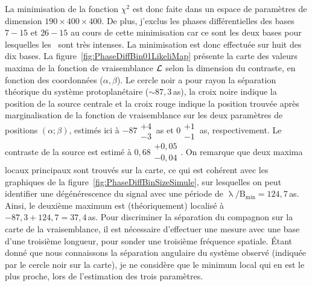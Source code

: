 La minimisation de la fonction $\chi^2$ est donc faite dans un espace de paramètres de dimension $190 \times 400 \times 400$. De plus, j'exclus les phases différentielles des bases $7-15$ et $26-15$ au cours de cette minimisation car ce sont les deux bases pour lesquelles les \wiggles~sont très intenses. La minimisation est donc effectuée sur huit des dix bases. La figure~\ref{fig:PhaseDiffBin01LikeliMap} présente la carte des valeurs maxima de la fonction de vraisemblance $\mathcal{L}$ selon la dimension du contraste, en fonction des coordonnées ($\alpha, \beta$). Le cercle noir a pour rayon la séparation théorique du système protoplanétaire ($\sim 87,3\,$as), la croix noire indique la position de la source centrale et la croix rouge indique la position trouvée après marginalisation de la fonction de vraisemblance sur les deux paramètres de positions $(\alpha; \beta)$, estimés ici à $-87\substack{+4 \\ -3} \,$as et $0\substack{+1 \\ -1} \,$as, respectivement. Le contraste de la source est estimé à $0,68\substack{+0,05 \\ -0,04}$. On remarque que deux maxima locaux principaux sont trouvés sur la carte, ce qui est cohérent avec les graphiques de la figure~\ref{fig:PhaseDiffBinSizeSimule}, sur lesquelles on peut identifier une dégénérescence du signal avec une période de $\uplambda / \text{B}_{\text{min}} = 124,7 \,$as. Ainsi, le deuxième maximum est (théoriquement) localisé à $-87,3 + 124,7 = 37,4 \,$as. Pour discriminer la séparation du compagnon sur la carte de la vraisemblance, il est nécessaire d'effectuer une mesure avec une base d'une troisième longueur, pour sonder une troisième fréquence spatiale. Étant donné que nous connaissons la séparation angulaire du système observé (indiquée par le cercle noir sur la carte), je ne considère que le minimum local qui en est le plus proche, lors de l'estimation des trois paramètres.

